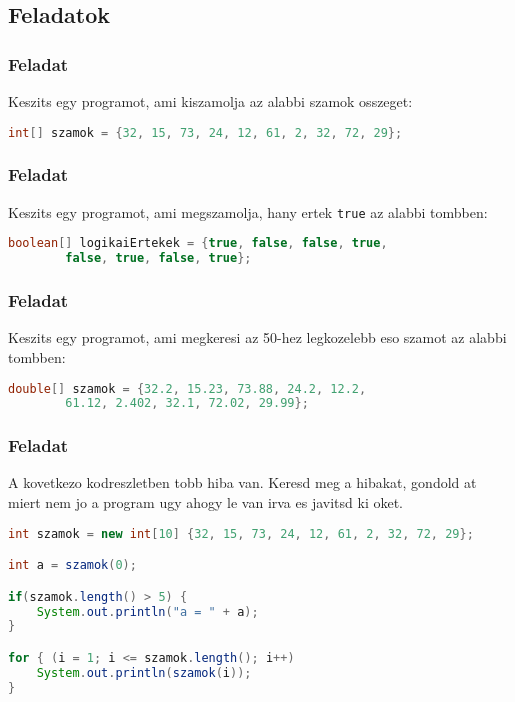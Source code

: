 \documentclass{article}
\begin{document}
\newpage

\subsection{Feladatok}

\subsubsection{Feladat}

Keszits egy programot, ami kiszamolja az alabbi szamok osszeget:

\begin{lstlisting}[language=Java, caption=Feladat]
int[] szamok = {32, 15, 73, 24, 12, 61, 2, 32, 72, 29};
\end{lstlisting}

\subsubsection{Feladat}

Keszits egy programot, ami megszamolja, hany ertek \lstinline{true} az alabbi tombben:

\begin{lstlisting}[language=Java, caption=Feladat]
boolean[] logikaiErtekek = {true, false, false, true,
        false, true, false, true};
\end{lstlisting}

\subsubsection{Feladat}

Keszits egy programot, ami megkeresi az 50-hez legkozelebb eso szamot az alabbi tombben:

\begin{lstlisting}[language=Java, caption=Feladat]
double[] szamok = {32.2, 15.23, 73.88, 24.2, 12.2,
        61.12, 2.402, 32.1, 72.02, 29.99};
\end{lstlisting}

\subsubsection{Feladat}

A kovetkezo kodreszletben tobb hiba van. Keresd meg a hibakat, gondold at miert nem jo a program ugy ahogy le van irva es javitsd ki oket.

\begin{lstlisting}[language=Java, caption=Feladat]
int szamok = new int[10] {32, 15, 73, 24, 12, 61, 2, 32, 72, 29};

int a = szamok(0);

if(szamok.length() > 5) {
    System.out.println("a = " + a);
}

for { (i = 1; i <= szamok.length(); i++)
    System.out.println(szamok(i));
}
\end{lstlisting}
\end{document}
